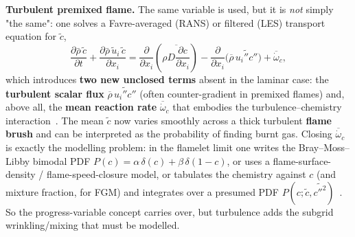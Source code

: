 {\textbf{Turbulent premixed flame.} The same variable is used, but it is \emph{not} simply "the same": one solves a Favre-averaged (RANS) or filtered (LES) transport equation for $\tilde c$,
\begin{equation*}
\frac{\partial \bar\rho\,\tilde c}{\partial t} + \frac{\partial \bar\rho\,\tilde u_i\,\tilde c}{\partial x_i} = \frac{\partial}{\partial x_i}\!\left(\overline{\rho D\frac{\partial c}{\partial x_i}}\right) - \frac{\partial}{\partial x_i}\big(\overline{\rho}\,\widetilde{u_i'' c''}\big) + \overline{\dot\omega}_c,
\end{equation*}
which introduces \textbf{two new unclosed terms} absent in the laminar case: the \textbf{turbulent scalar flux} $\overline{\rho}\,\widetilde{u_i'' c''}$ (often counter-gradient in premixed flames) and, above all, the \textbf{mean reaction rate} $\overline{\dot\omega}_c$ that embodies the turbulence--chemistry interaction~\cite{lecture10,veynante2002turbulent}. The mean $\tilde c$ now varies smoothly across a thick turbulent \textbf{flame brush} and can be interpreted as the probability of finding burnt gas. Closing $\overline{\dot\omega}_c$ is exactly the modelling problem: in the flamelet limit one writes the Bray--Moss--Libby bimodal PDF $P(c)=\alpha\,\delta(c)+\beta\,\delta(1-c)$, or uses a flame-surface-density / flame-speed-closure model, or tabulates the chemistry against $c$ (and mixture fraction, for FGM) and integrates over a presumed PDF $P(c;\tilde c,\widetilde{c''^2})$~\cite{lecture10,peters2000turbulent,vanoijen2000fgm}. So the progress-variable concept carries over, but turbulence adds the subgrid wrinkling/mixing that must be modelled.
}



 


